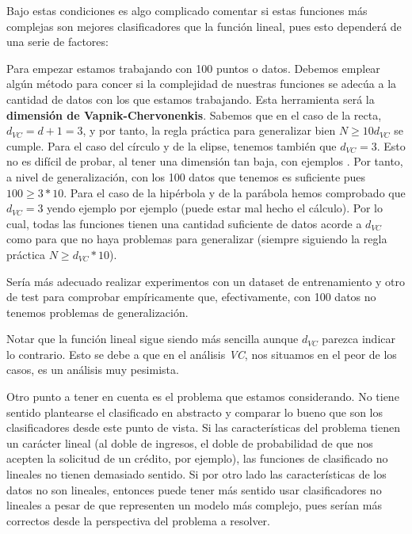 \documentclass[11pt]{article}
\begin{document}
Bajo estas condiciones es algo complicado comentar si estas funciones más complejas son mejores clasificadores que la función lineal, pues esto dependerá de una serie de factores:

Para empezar estamos trabajando con 100 puntos o datos. Debemos emplear algún método para concer si la complejidad de nuestras funciones se adecúa a la cantidad de datos con los que estamos trabajando. Esta herramienta será la \textbf{dimensión de Vapnik-Chervonenkis}. Sabemos que en el caso de la recta, $d_{VC} = d + 1 = 3$, y por tanto, la regla práctica para generalizar bien $N \geq 10 d_{VC}$ se cumple. Para el caso del círculo y de la elipse, tenemos también que $d_{VC} = 3$. Esto no es difícil de probar, al tener una dimensión tan baja, con ejemplos \footnotemark. Por tanto, a nivel de generalización, con los 100 datos que tenemos es suficiente pues $100 \geq 3 * 10$. Para el caso de la hipérbola y de la parábola hemos comprobado que $d_{VC} = 3$ yendo ejemplo por ejemplo (puede estar mal hecho el cálculo). Por lo cual, todas las funciones tienen una cantidad suficiente de datos acorde a $d_{VC}$ como para que no haya problemas para generalizar (siempre siguiendo la regla práctica $N \geq d_{VC} * 10$).

Sería más adecuado realizar experimentos con un dataset de entrenamiento y otro de test para comprobar empíricamente que, efectivamente, con 100 datos no tenemos problemas de generalización.

Notar que la función lineal sigue siendo más sencilla aunque $d_{VC}$ parezca indicar lo contrario. Esto se debe a que en el análisis \emph{VC}, nos situamos en el peor de los casos, es un análisis muy pesimista.

Otro punto a tener en cuenta es el problema que estamos considerando. No tiene sentido plantearse el clasificado en abstracto y comparar lo bueno que son los clasificadores desde este punto de vista. Si las características del problema tienen un carácter lineal (al doble de ingresos, el doble de probabilidad de que nos acepten la solicitud de un crédito, por ejemplo), las funciones de clasificado no lineales no tienen demasiado sentido. Si por otro lado las características de los datos no son lineales, entonces puede tener más sentido usar clasificadores no lineales a pesar de que representen un modelo más complejo, pues serían más correctos desde la perspectiva del problema a resolver.
\end{document}
